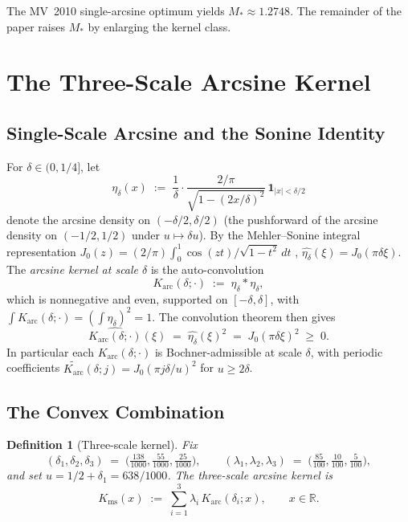 \documentclass[11pt, letterpaper]{article}
\theoremstyle{paperplain}
\theoremstyle{paperdef}
\newtheorem{definition}[theorem]{Definition}
\newcommand{\R}{\mathbb{R}}
\newcommand{\Karc}{K_{\mathrm{arc}}}
\newcommand{\Kms}{K_{\mathrm{ms}}}
\begin{document}
The MV~2010 single-arcsine optimum yields $M_*\approx 1.2748$.  The
remainder of the paper raises $M_*$ by enlarging the kernel class.

\section{The Three-Scale Arcsine Kernel}\label{sec:kernel}

\subsection{Single-Scale Arcsine and the Sonine Identity}\label{subsec:kernel-single}

For $\delta\in(0,1/4]$, let
\[
  \eta_\delta(x)
  \;:=\;
  \frac{1}{\delta}\cdot
  \frac{2/\pi}{\sqrt{1-(2x/\delta)^2}}\,
  \mathbf{1}_{|x|<\delta/2}
\]
denote the arcsine density on $(-\delta/2,\delta/2)$ (the
pushforward of the arcsine density on $(-1/2,1/2)$ under
$u\mapsto\delta u$).  By the Mehler--Sonine integral
representation $J_0(z)=(2/\pi)\int_0^1\!\cos(zt)/\sqrt{1-t^2}\,dt$
\cite[\S 10.9.4]{DLMF}, $\widehat{\eta_\delta}(\xi)=J_0(\pi\delta\xi)$.  The \emph{arcsine kernel at scale $\delta$} is the
auto-convolution
\[
  \Karc(\delta;\cdot)
  \;:=\;
  \eta_\delta*\eta_\delta,
\]
which is nonnegative and even, supported on $[-\delta,\delta]$, with
$\int\Karc(\delta;\cdot)=(\int\eta_\delta)^2=1$.  The convolution
theorem then gives
\begin{equation}\label{eq:sonine}
  \widehat{\Karc(\delta;\cdot)}(\xi)
  \;=\;
  \widehat{\eta_\delta}(\xi)^{2}
  \;=\; J_0(\pi\delta\xi)^2
  \;\ge\; 0.
\end{equation}
In particular each $\Karc(\delta;\cdot)$ is Bochner-admissible at
scale $\delta$, with periodic coefficients
$\widetilde{\Karc}(\delta;j)=J_0(\pi j\delta/u)^2$ for $u\ge 2\delta$.

\subsection{The Convex Combination}\label{subsec:kernel-combo}

\begin{definition}[Three-scale kernel]
\label{def:Kms}
Fix
\begin{equation}\label{eq:anchors}
  (\delta_1,\delta_2,\delta_3)
  \;=\;
  \bigl(\tfrac{138}{1000},\tfrac{55}{1000},\tfrac{25}{1000}\bigr),
  \qquad
  (\lambda_1,\lambda_2,\lambda_3)
  \;=\;
  \bigl(\tfrac{85}{100},\tfrac{10}{100},\tfrac{5}{100}\bigr),
\end{equation}
and set $u=1/2+\delta_1=638/1000$.  The
\emph{three-scale arcsine kernel} is
\[
  \Kms(x)
  \;:=\;
  \sum_{i=1}^{3}\lambda_i\,\Karc(\delta_i;x),
  \qquad x\in\R.
\]
\end{definition}
\end{document}
